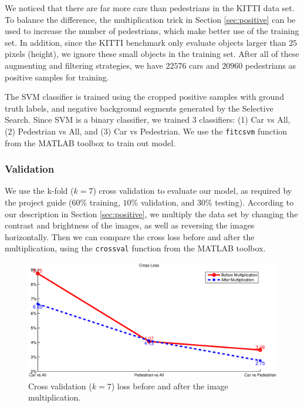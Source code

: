 \documentclass{article} %
\begin{document}
We noticed that there are far more cars than pedestrians in the KITTI data set. To balance the difference, the multiplication trick in Section \ref{sec:positive} can be used to increase the number of pedestrians, which make better use of the training set. In addition, since the KITTI benchmark only evaluate objects larger than $25$ pixels (height), we ignore these small objects in the training set. After all of these augmenting and filtering strategies, we have $22576$ cars and $20960$ pedestrians as positive samples for training.

The SVM classifier is trained using the cropped positive samples with ground truth labels, and negative background segments generated by the Selective Search. Since SVM is a binary classifier, we trained 3 classifiers: (1) Car vs All, (2) Pedestrian vs All, and (3) Car vs Pedestrian. We use the \texttt{fitcsvm} function from the MATLAB toolbox to train out model.

\subsubsection{Validation}

We use the k-fold ($k=7$) cross validation to evaluate our model, as required by the project guide ($60\%$ training, $10\%$ validation, and $30\%$ testing). According to our description in Section \ref{sec:positive}, we multiply the data set by changing the contrast and brightness of the images, as well as reversing the images horizontally. Then we can compare the cross loss before and after the multiplication, using the \texttt{crossval} function from the MATLAB toolbox.

\begin{figure}[htb]
\begin{center}
\includegraphics[width=\textwidth]{crossloss.eps}
\end{center}
\caption{Cross validation ($k=7$) loss before and after the image multiplication.
\label{fig:crossloss}}
\end{figure}
\end{document}
